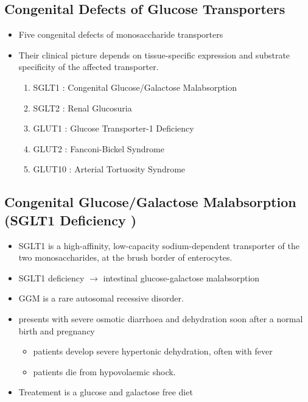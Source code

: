 \documentclass{scrartcl}
\begin{document}
\subsection{Congenital Defects of Glucose Transporters}
\label{sec:orga746f38}
\begin{itemize}
\item Five congenital defects of monosaccharide transporters
\item Their clinical picture depends on tissue-specific expression and
substrate specificity of the affected transporter.

\begin{enumerate}
\item SGLT1 : Congenital Glucose/Galactose Malabsorption
\item SGLT2 : Renal Glucosuria
\item GLUT1 : Glucose Transporter-1 Deficiency
\item GLUT2 : Fanconi-Bickel Syndrome
\item GLUT10 : Arterial Tortuosity Syndrome
\end{enumerate}
\end{itemize}

\subsection{Congenital Glucose/Galactose Malabsorption (SGLT1 Deficiency )}
\label{sec:orgd51ac4a}

\begin{itemize}
\item SGLT1 is a high-affinity, low-capacity sodium-dependent transporter
of the two monosaccharides, at the brush border of enterocytes.

\item SGLT1 deficiency \(\to\) intestinal glucose-galactose malabsorption
\item GGM is a rare autosomal recessive disorder.

\item presents with severe osmotic diarrhoea and dehydration soon after a
normal birth and pregnancy
\begin{itemize}
\item patients develop severe hypertonic dehydration, often with fever
\item patients die from hypovolaemic shock.
\end{itemize}

\item Treatement is a glucose and galactose free diet
\end{itemize}
\end{document}
